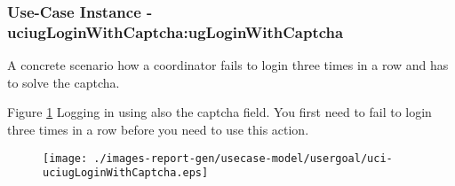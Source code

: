 
	\subsubsection{Use-Case Instance - uciugLoginWithCaptcha:ugLoginWithCaptcha}
	
	A concrete scenario how a coordinator fails to login three times in a row and has to solve the captcha.		  
	\begin{operationmodel}
	
	\end{operationmodel} 

	
	Figure \ref{fig:lu.uni.lassy.excalibur.MyCrash.G02-RE-UC-uci-uciugLoginWithCaptcha}
	Logging in using also the captcha field. You first need to fail to login three times in a row before you need to use this action.
	
	\begin{figure}[htbp]
	\begin{center}
	
	\texttt{[image: ./images-report-gen/usecase-model/usergoal/uci-uciugLoginWithCaptcha.eps]}
	\end{center}
	\caption[lu.uni.lassy.excalibur.MyCrash.G02 Sequence Diagram: uci-uciugLoginWithCaptcha]{}
	\label{fig:lu.uni.lassy.excalibur.MyCrash.G02-RE-UC-uci-uciugLoginWithCaptcha}
	\end{figure}
	\vspace{0.5cm}
